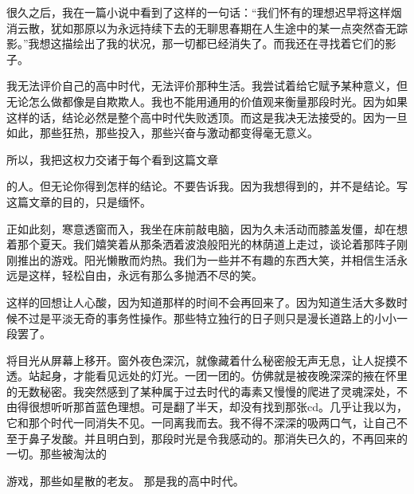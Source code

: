 \documentclass{article}
\begin{document}
很久之后，我在一篇小说中看到了这样的一句话：“我们怀有的理想迟早将这样烟消云散，犹如那原以为永远持续下去的无聊思春期在人生途中的某一点突然杳无踪影。”我想这描绘出了我的状况，那一切都已经消失了。而我还在寻找着它们的影子。


我无法评价自己的高中时代，无法评价那种生活。我尝试着给它赋予某种意义，但无论怎么做都像是自欺欺人。我也不能用通用的价值观来衡量那段时光。因为如果这样的话，结论必然是整个高中时代失败透顶。而这是我决无法接受的。因为一旦如此，那些狂热，那些投入，那些兴奋与激动都变得毫无意义。

所以，我把这权力交诸于每个看到这篇文章

\newpage 

的人。但无论你得到怎样的结论。不要告诉我。因为我想得到的，并不是结论。写这篇文章的目的，只是缅怀。


正如此刻，寒意透窗而入，我坐在床前敲电脑，因为久未活动而膝盖发僵，却在想着那个夏天。我们嬉笑着从那条洒着波浪般阳光的林荫道上走过，谈论着那阵子刚刚推出的游戏。阳光懒散而灼热。我们为一些并不有趣的东西大笑，并相信生活永远是这样，轻松自由，永远有那么多抛洒不尽的笑。

这样的回想让人心酸，因为知道那样的时间不会再回来了。因为知道生活大多数时候不过是平淡无奇的事务性操作。那些特立独行的日子则只是漫长道路上的小小一段罢了。

将目光从屏幕上移开。窗外夜色深沉，就像藏着什么秘密般无声无息，让人捉摸不透。站起身，才能看见远处的灯光。一团一团的。仿佛就是被夜晚深深的掖在怀里的无数秘密。我突然感到了某种属于过去时代的毒素又慢慢的爬进了灵魂深处，不由得很想听听那首蓝色理想。可是翻了半天，却没有找到那张cd。几乎让我以为，它和那个时代一同消失不见。一同离我而去。我不得不深深的吸两口气，让自己不至于鼻子发酸。并且明白到，那段时光是令我感动的。那消失已久的，不再回来的一切。那些被淘汰的

\newpage 

游戏，那些如星散的老友。
那是我的高中时代。
\end{document}
